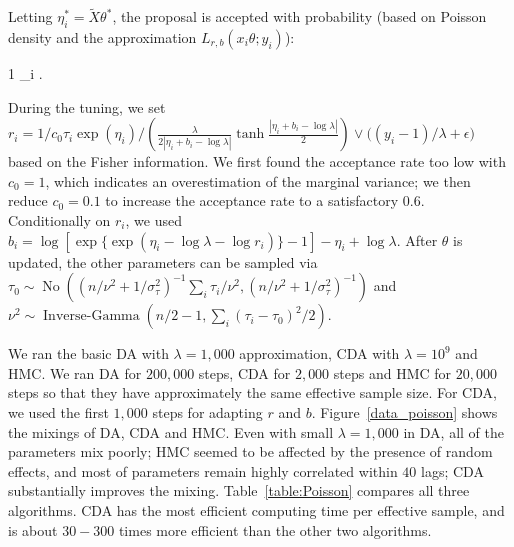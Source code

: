 \documentclass[12pt]{article}
\newcommand{\xtheta}{ x_i \theta}
\newcommand{\be}{\begin{equs}}
\newcommand{\ee}{\end{equs}}
\DeclareMathOperator{\No}{No}
\DeclareMathOperator{\IG}{Inverse-Gamma}
\begin{document}
Letting $\eta_i^* = \tilde X \theta^*$, the proposal is accepted with probability (based on Poisson density and the approximation $L_{r,b}(\xtheta;y_i)$):
\be
1 \wedge \prod_i   .
\ee
 
During the tuning, we set $r_i = 1/c_0 \tau_i\exp(\eta_i) /  \left( \frac{\lambda } {2|\eta_i + b_i - \log\lambda|}  \tanh\frac{ |\eta_i + b_i - \log\lambda|}{2} \right ) \vee \big( (y_i-1)/\lambda + \epsilon \big)$ based on the Fisher information. We first found the acceptance rate too low with $c_0 =1$, which indicates an overestimation of the marginal variance; we then reduce $c_0=0.1$ to increase the acceptance rate to a satisfactory $0.6$. Conditionally on $r_i$, we used $b_i=\log[ \exp \{ \exp(\eta_i - \log\lambda -\log r_i)   \}-1] -\eta_i + \log\lambda$. After $\theta$ is updated, the other parameters can be sampled via $\tau_0\sim \No\left( (n/ \nu^2 + 1/ \sigma^2_\tau)^{-1} \sum_i \tau_i/\nu^2 , (n/ \nu^2 + 1/ \sigma^2_\tau)^{-1}  \right)$ and $\nu^2 \sim \IG ( n/2-1, \sum_i (\tau_i-\tau_0)^2 /2)$.


We ran the basic DA with $\lambda=1,000$ approximation, CDA with $\lambda=10^9$ and HMC. We ran DA for $200,000$ steps, CDA for $2,000$ steps and HMC for $20,000$ steps so that they have approximately the same effective sample size. For CDA, we used the first $1,000$ steps for adapting $r$ and $b$. Figure~\ref{data_poisson} shows the mixings of DA, CDA and HMC. Even with small $\lambda = 1,000$ in DA, all of the parameters mix poorly; HMC seemed to be affected by the presence of random effects, and most of parameters remain highly correlated within $40$ lags; CDA substantially improves the mixing. Table~\ref{table:Poisson} compares all three algorithms. CDA has the most efficient computing time per effective sample, and is about $30-300$ times more efficient than the other two algorithms.
\end{document}
